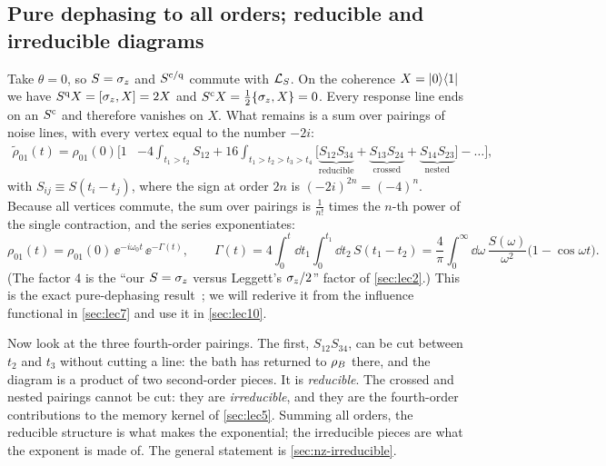\subsection{Pure dephasing to all orders; reducible and irreducible diagrams}

\begin{exbox}[Example 4.3: $\theta=0$ and the first irreducible diagram]
Take $\theta=0$, so $S=\sigma_z$ and $S^{\mathrm{c}/\mathrm{q}}$ commute with $\mathcal{L}_S$.
On the coherence $X=|0\rangle\langle1|$ we have $S^{\mathrm{q}} X=[\sigma_z,X]=2X$ and $S^{\mathrm{c}} X=\tfrac12\{\sigma_z,X\}=0$.
Every response line ends on an $S^{\mathrm{c}}$ and therefore vanishes on $X$.
What remains is a sum over pairings of noise lines, with every vertex equal to the number $-2i$:
\begin{align}
  \tilde\rho_{01}(t)=\rho_{01}(0)\Big[1
  &-4\!\int_{t_1>t_2}\!S_{12}
  +16\!\int_{t_1>t_2>t_3>t_4}\!\big[\underbrace{S_{12}S_{34}}_{\text{reducible}}
    +\underbrace{S_{13}S_{24}}_{\text{crossed}}
    +\underbrace{S_{14}S_{23}}_{\text{nested}}\big]-\dots\Big],
  \label{eq:dephasing-4th}
\end{align}
with $S_{ij}\equiv S(t_i-t_j)$, where the sign at order $2n$ is $(-2i)^{2n}=(-4)^n$.
Because all vertices commute, the sum over pairings is $\frac1{n!}$ times the $n$-th power of the single contraction, and the series exponentiates:
\begin{equation}
  \rho_{01}(t)=\rho_{01}(0)\,\ee^{-i\omega_0t}\,\ee^{-\Gamma(t)},\qquad
  \Gamma(t)=4\!\int_0^t\!\dd t_1\!\int_0^{t_1}\!\dd t_2\,S(t_1-t_2)
  =\frac4\pi\int_0^\infty\!\dd\omega\,\frac{S(\omega)}{\omega^2}\big(1-\cos\omega t\big).
  \label{eq:dephasing-exact}
\end{equation}
(The factor 4 is the ``our $S=\sigma_z$ versus Leggett's $\sigma_z/2$'' factor of \cref{sec:lec2}.)
This is the exact pure-dephasing result~\cite[Sec.~4.2]{BreuerPetruccione}; we will rederive it from the influence functional in \cref{sec:lec7} and use it in \cref{sec:lec10}.

Now look at the three fourth-order pairings.
The first, $S_{12}S_{34}$, can be cut between $t_2$ and $t_3$ without cutting a line: the bath has returned to $\rho_{B}$ there, and the diagram is a product of two second-order pieces.
It is \emph{reducible}.
The crossed and nested pairings cannot be cut: they are \emph{irreducible}, and they are the fourth-order contributions to the memory kernel of \cref{sec:lec5}.
Summing all orders, the reducible structure is what makes the exponential; the irreducible pieces are what the exponent is made of.
The general statement is \cref{sec:nz-irreducible}.
\end{exbox}

